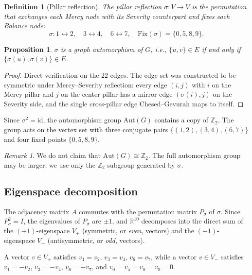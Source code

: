 \documentclass[11pt,a4paper]{amsart}
\newtheorem{proposition}[theorem]{Proposition}
\newtheorem{definition}[theorem]{Definition}
\theoremstyle{remark}
\newtheorem{remark}[theorem]{Remark}
\newcommand{\bbZ}{\mathbb{Z}}
\newcommand{\bbR}{\mathbb{R}}
\newcommand{\Aut}{\mathrm{Aut}}
\newcommand{\id}{\mathrm{id}}
\begin{document}
\begin{definition}[Pillar reflection]
\label{def:pillar-reflection}
The \emph{pillar reflection} $\sigma: V \to V$ is the permutation that
exchanges each Mercy node with its Severity counterpart and fixes each
Balance node:
\begin{equation}
\sigma: 1 \leftrightarrow 2, \quad 3 \leftrightarrow 4, \quad
6 \leftrightarrow 7, \quad \mathrm{Fix}(\sigma) = \{0, 5, 8, 9\}.
\end{equation}
\end{definition}

\begin{proposition}
\label{prop:sigma-automorphism}
$\sigma$ is a graph automorphism of $G$, i.e.,
$\{u,v\} \in E$ if and only if $\{\sigma(u), \sigma(v)\} \in E$.
\end{proposition}

\begin{proof}
Direct verification on the $22$ edges. The edge set was constructed to be
symmetric under Mercy--Severity reflection: every edge $(i,j)$ with $i$ on
the Mercy pillar and $j$ on the center pillar has a mirror edge
$(\sigma(i), j)$ on the Severity side, and the single cross-pillar edge
Chesed--Gevurah maps to itself.
\end{proof}

Since $\sigma^2 = \id$, the automorphism group $\Aut(G)$ contains a copy of
$\bbZ_2$. The group acts on the vertex set with three conjugate pairs
$\{(1,2), (3,4), (6,7)\}$ and four fixed points $\{0, 5, 8, 9\}$.

\begin{remark}
We do not claim that $\Aut(G) \cong \bbZ_2$. The full automorphism group
may be larger; we use only the $\bbZ_2$ subgroup generated by $\sigma$.
\end{remark}

\subsection{Eigenspace decomposition}
\label{sec:eigenspace-decomp}

The adjacency matrix $A$ commutes with the permutation matrix $P_\sigma$ of
$\sigma$. Since $P_\sigma^2 = I$, the eigenvalues of $P_\sigma$ are $\pm 1$,
and $\bbR^{10}$ decomposes into the direct sum of the $(+1)$-eigenspace
$V_+$ (symmetric, or \emph{even}, vectors) and the $(-1)$-eigenspace $V_-$
(antisymmetric, or \emph{odd}, vectors).

A vector $v \in V_+$ satisfies $v_1 = v_2$, $v_3 = v_4$, $v_6 = v_7$, while
a vector $v \in V_-$ satisfies $v_1 = -v_2$, $v_3 = -v_4$, $v_6 = -v_7$,
and $v_0 = v_5 = v_8 = v_9 = 0$.
\end{document}
